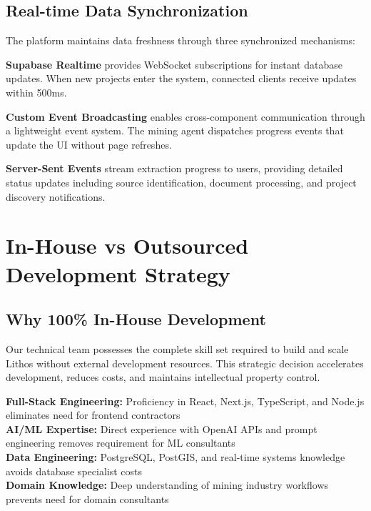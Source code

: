 \documentclass[11pt]{article}
\begin{document}
\subsection{Real-time Data Synchronization}

The platform maintains data freshness through three synchronized mechanisms:

\textbf{Supabase Realtime} provides WebSocket subscriptions for instant database updates. When new projects enter the system, connected clients receive updates within 500ms.

\textbf{Custom Event Broadcasting} enables cross-component communication through a lightweight event system. The mining agent dispatches progress events that update the UI without page refreshes.

\textbf{Server-Sent Events} stream extraction progress to users, providing detailed status updates including source identification, document processing, and project discovery notifications.

\section{In-House vs Outsourced Development Strategy}

\subsection{Why 100\% In-House Development}

Our technical team possesses the complete skill set required to build and scale Lithos without external development resources. This strategic decision accelerates development, reduces costs, and maintains intellectual property control.

\begin{metricbox}
\textbf{Full-Stack Engineering:} Proficiency in React, Next.js, TypeScript, and Node.js eliminates need for frontend contractors\\[0.3em]
\textbf{AI/ML Expertise:} Direct experience with OpenAI APIs and prompt engineering removes requirement for ML consultants\\[0.3em]
\textbf{Data Engineering:} PostgreSQL, PostGIS, and real-time systems knowledge avoids database specialist costs\\[0.3em]
\textbf{Domain Knowledge:} Deep understanding of mining industry workflows prevents need for domain consultants
\end{metricbox}
\end{document}
